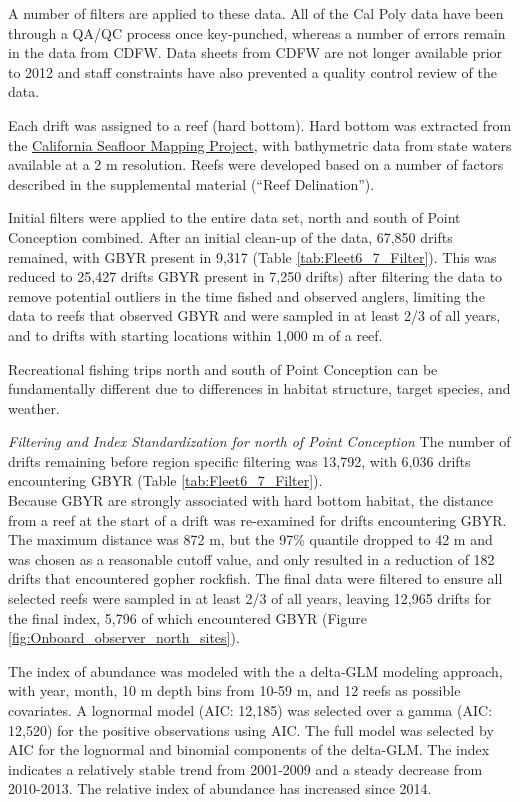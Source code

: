 \documentclass[12pt,]{article}
\begin{document}
A number of filters are applied to these data. All of the Cal Poly data
have been through a QA/QC process once key-punched, whereas a number of
errors remain in the data from CDFW. Data sheets from CDFW are not
longer available prior to 2012 and staff constraints have also prevented
a quality control review of the data.

Each drift was assigned to a reef (hard bottom). Hard bottom was
extracted from the
\href{http://seafloor.otterlabs.org/index.html}{California Seafloor
Mapping Project}, with bathymetric data from state waters available at a
2 m resolution. Reefs were developed based on a number of factors
described in the supplemental material (``Reef Delination'').

Initial filters were applied to the entire data set, north and south of
Point Conception combined. After an initial clean-up of the data, 67,850
drifts remained, with GBYR present in 9,317 (Table
\ref{tab:Fleet6_7_Filter}). This was reduced to 25,427 drifts GBYR
present in 7,250 drifts) after filtering the data to remove potential
outliers in the time fished and observed anglers, limiting the data to
reefs that observed GBYR and were sampled in at least 2/3 of all years,
and to drifts with starting locations within 1,000 m of a reef.

Recreational fishing trips north and south of Point Conception can be
fundamentally different due to differences in habitat structure, target
species, and weather.

\emph{Filtering and Index Standardization for north of Point Conception}
The number of drifts remaining before region specific filtering was
13,792, with 6,036 drifts encountering GBYR (Table
\ref{tab:Fleet6_7_Filter}).\\
Because GBYR are strongly associated with hard bottom habitat, the
distance from a reef at the start of a drift was re-examined for drifts
encountering GBYR. The maximum distance was 872 m, but the 97\% quantile
dropped to 42 m and was chosen as a reasonable cutoff value, and only
resulted in a reduction of 182 drifts that encountered gopher rockfish.
The final data were filtered to ensure all selected reefs were sampled
in at least 2/3 of all years, leaving 12,965 drifts for the final index,
5,796 of which encountered GBYR (Figure
\ref{fig:Onboard_observer_north_sites}).

The index of abundance was modeled with the a delta-GLM modeling
approach, with year, month, 10 m depth bins from 10-59 m, and 12 reefs
as possible covariates. A lognormal model (AIC: 12,185) was selected
over a gamma (AIC: 12,520) for the positive observations using AIC. The
full model was selected by AIC for the lognormal and binomial components
of the delta-GLM. The index indicates a relatively stable trend from
2001-2009 and a steady decrease from 2010-2013. The relative index of
abundance has increased since 2014.
\end{document}
